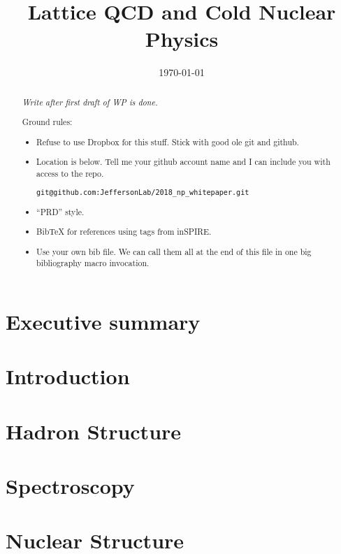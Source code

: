 \documentclass[aps,prd,nofootinbib,floatfix,superscriptaddress,preprint,tightenlines]{revtex4-1}
\begin{document}
\title{Lattice QCD and Cold Nuclear Physics}
\noaffiliation

\date{\today}
%
\begin{abstract}
\emph{Write after first draft of WP is done.}
    
Ground rules:
\begin{itemize}
    \item Refuse to use Dropbox for this stuff. Stick with good ole git and github.
    \item Location is below. Tell me your github account name and I
      can include you with access to the repo.
\begin{verbatim}git@github.com:JeffersonLab/2018_np_whitepaper.git\end{verbatim}
  \item ``PRD'' style.
  \item BibTeX for references using tags from inSPIRE.
  \item Use your own bib file. We can call them all at the end of this
    file in one big bibliography macro invocation.
\end{itemize}
\end{abstract}

\maketitle

\section{Executive summary}

\section{Introduction}

\section{Hadron Structure}
%

\section{Spectroscopy}
%

\section{Nuclear Structure}
%

\begin{figure}
    \vspace*{3cm}
\end{figure}



\end{document}
